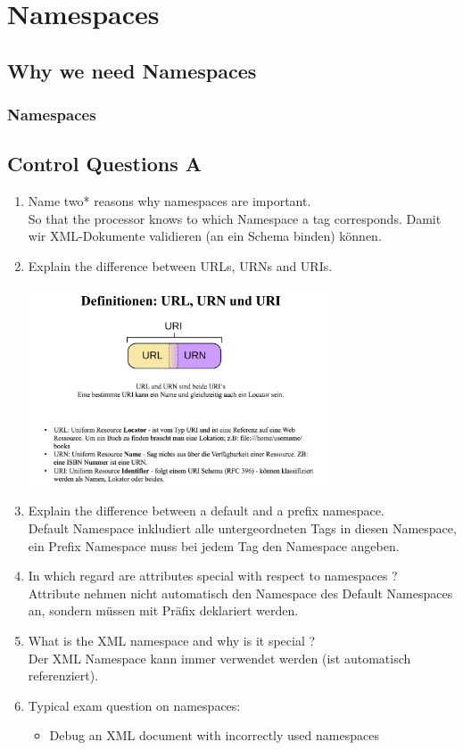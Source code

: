\chapter{Namespaces}
\section{Why we need Namespaces}
\subsection{Namespaces}


\section{Control Questions A}
\begin{enumerate}
\item Name two* reasons why namespaces are important.\\
So that the processor knows to which Namespace a tag corresponds. Damit wir XML-Dokumente validieren (an ein Schema binden) können.
\item Explain the difference between URLs, URNs and URIs.\\
\begin{center}
\includegraphics[width=0.7\textwidth]{fig/URI.png}
\end{center}
\item Explain the difference between a default and a prefix namespace.\\
Default Namespace inkludiert alle untergeordneten Tags in diesen Namespace, ein Prefix Namespace muss bei jedem Tag den Namespace angeben.
\item In which regard are attributes special with respect to namespaces ?\\
Attribute nehmen nicht automatisch den Namespace des Default Namespaces an, sondern müssen mit Präfix deklariert werden.
\item What is the XML namespace and why is it special ?\\
Der XML Namespace kann immer verwendet werden (ist automatisch referenziert).
\item Typical exam question on namespaces:
\begin{itemize}
\item Debug an XML document with incorrectly used namespaces
\end{itemize}
\end{enumerate}
